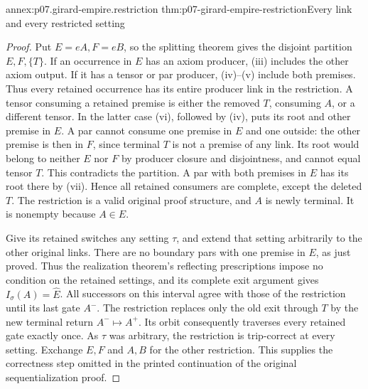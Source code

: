 \begin{annexitem}{annex:p07.girard-empire.restriction}
 {thm:p07-girard-empire-restriction}{Every link and every restricted setting}
\begin{proof}
Put \(E=eA,F=eB\), so the splitting theorem gives the disjoint
partition \(E,F,\{T\}\).
If an occurrence in \(E\) has an axiom producer, (iii) includes the
other axiom output. If it has a tensor or par producer, (iv)--(v)
include both premises. Thus every retained occurrence has its entire
producer link in the restriction.
A tensor consuming a retained premise is either the removed \(T\),
consuming \(A\), or a different tensor. In the latter case (vi),
followed by (iv), puts its root and other premise in \(E\).
A par cannot consume one premise in \(E\) and one outside:
the other premise is then in \(F\), since terminal \(T\) is not
a premise of any link. Its root would belong to neither \(E\) nor
\(F\) by producer closure and disjointness, and cannot equal tensor
\(T\). This contradicts the partition. A par with both premises
in \(E\) has its root there by (vii).
Hence all retained consumers are complete, except the deleted \(T\).
The restriction is a valid original proof structure, and \(A\) is
newly terminal. It is nonempty because \(A\in E\).

Give its retained switches any setting \(\tau\), and extend that
setting arbitrarily to the other original links.
There are no boundary pars with one premise in \(E\), as just proved.
Thus the realization theorem's reflecting prescriptions impose no
condition on the retained settings, and its complete exit argument
gives \(I_\sigma(A)=\widehat E\).
All successors on this interval agree with those of the restriction
until its last gate \(A^-\). The restriction replaces only the old
exit through \(T\) by the new terminal return \(A^-\mapsto A^+\).
Its orbit consequently traverses every retained gate exactly once.
As \(\tau\) was arbitrary, the restriction is trip-correct at every
setting. Exchange \(E,F\) and \(A,B\) for the other restriction.
This supplies the correctness step omitted in the printed continuation
of the original sequentialization proof.
\end{proof}
\end{annexitem}

